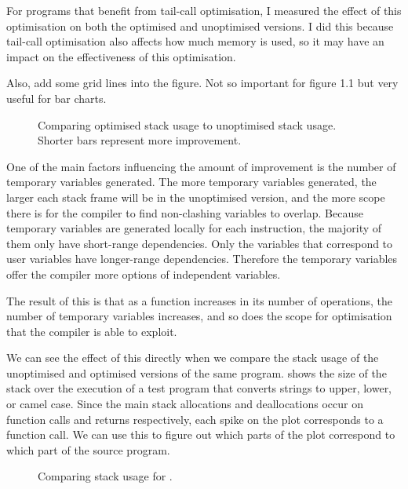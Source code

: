 \documentclass[00-main.tex]{subfiles}
\begin{document}
For programs that benefit from tail-call optimisation, I measured the effect of this optimisation on both the optimised and unoptimised versions.
I did this because tail-call optimisation also affects how much memory is used, so it may have an impact on the effectiveness of this optimisation.

\begin{Comment}
Also, add some grid lines into the figure.  Not so important for
figure 1.1 but very useful for bar charts.
\end{Comment}

\begin{figure}[ht]
  \centering
  \caption{Comparing optimised stack usage to unoptimised stack usage. Shorter bars represent more improvement.}
  \label{fig:comparing stack usage optimisation across programs}
\end{figure}

One of the main factors influencing the amount of improvement is the number of temporary variables generated.
The more temporary variables generated, the larger each stack frame will be in the unoptimised version, and the more scope there is for the compiler to find non-clashing variables to overlap.
Because temporary variables are generated locally for each instruction, the majority of them only have short-range dependencies.
Only the variables that correspond to user variables have longer-range dependencies.
Therefore the temporary variables offer the compiler more options of independent variables.

The result of this is that as a function increases in its number of operations, the number of temporary variables increases, and so does the scope for optimisation that the compiler is able to exploit.

We can see the effect of this directly when we compare the stack usage of the unoptimised and optimised versions of the same program.
 shows the size of the stack over the execution of a test program that converts strings to upper, lower, or camel case.
Since the main stack allocations and deallocations occur on function calls and returns respectively, each spike on the plot corresponds to a function call. We can use this to figure out which parts of the plot correspond to which part of the source program.

\begin{figure}[ht]
  \centering
  \caption{Comparing stack usage for .}
  \label{fig:comparing stack usage for case.c}
\end{figure}
\end{document}
